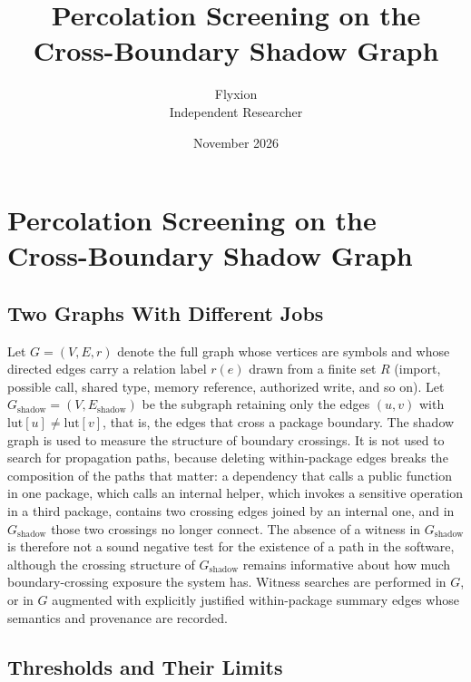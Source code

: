 \documentclass[11pt]{article}
\title{Percolation Screening on the Cross-Boundary Shadow Graph}
\author{Flyxion\\Independent Researcher}
\date{November 2026}
\newcommand{\Gsh}{G_{\mathrm{shadow}}}
\newcommand{\Esh}{E_{\mathrm{shadow}}}
\begin{document}
\maketitle

\section{Percolation Screening on the Cross-Boundary Shadow Graph}

\subsection{Two Graphs With Different Jobs}

Let $G=(V,E,r)$ denote the full graph whose vertices are symbols and whose directed edges carry a relation label $r(e)$ drawn from a finite set $R$ (import, possible call, shared type, memory reference, authorized write, and so on). Let $\Gsh=(V,\Esh)$ be the subgraph retaining only the edges $(u,v)$ with $\mathrm{lut}[u]\neq\mathrm{lut}[v]$, that is, the edges that cross a package boundary. The shadow graph is used to measure the structure of boundary crossings. It is not used to search for propagation paths, because deleting within-package edges breaks the composition of the paths that matter: a dependency that calls a public function in one package, which calls an internal helper, which invokes a sensitive operation in a third package, contains two crossing edges joined by an internal one, and in $\Gsh$ those two crossings no longer connect. The absence of a witness in $\Gsh$ is therefore not a sound negative test for the existence of a path in the software, although the crossing structure of $\Gsh$ remains informative about how much boundary-crossing exposure the system has. Witness searches are performed in $G$, or in $G$ augmented with explicitly justified within-package summary edges whose semantics and provenance are recorded.

\subsection{Thresholds and Their Limits}
\end{document}
